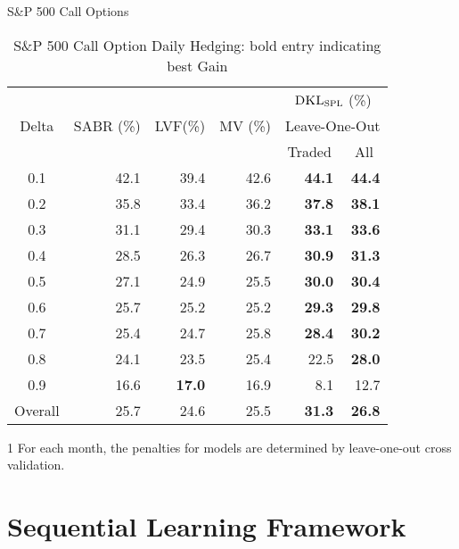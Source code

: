 \documentclass[10pt,table,mathserif]{beamer}
\newcommand{\DKLs}{\bf\textsc{DKL}_{\text{SPL}}}
\newcommand{\LVF}{\textsc{LVF}}
\begin{document}
\begin{frame}{S\&P 500 Call Options}
\begin{table}[htp!]
\centering
\begin{threeparttable}
\begin{tabular}{|c |r r r r r|}
\hline
\multirow{3}{*}{Delta}&\multirow{3}{*}{SABR (\%)}&\multirow{3}{*}{\LVF\;(\%)}&\multirow{3}{*}{MV (\%)}&\multicolumn{2}{c|}{$\DKLs$ (\%)}\\
&&&&\multicolumn{2}{c|}{\small Leave-One-Out\tnote{1} }\\
&&&&\multicolumn{1}{c}{\small Traded}&\multicolumn{1}{c|}{\small All}\\ \hline
  0.1 & 42.1 & 39.4 & 42.6 & \textbf{44.1} & \textbf{44.4}  \\
  0.2 & 35.8 & 33.4 & 36.2 & \textbf{37.8} & \textbf{38.1} \\
  0.3 & 31.1 & 29.4 & 30.3 & \textbf{33.1} & \textbf{33.6} \\
  0.4 & 28.5 & 26.3 & 26.7 & \textbf{30.9} & \textbf{31.3}   \\
  0.5 & 27.1 & 24.9 & 25.5 & \textbf{30.0}& \textbf{30.4}  \\
  0.6 & 25.7 & 25.2 & 25.2 & \textbf{29.3}& \textbf{29.8}  \\
  0.7 & 25.4 & 24.7 & 25.8 & \textbf{28.4} & \textbf{30.2}  \\
  0.8 & 24.1 & 23.5 & 25.4&   22.5& \textbf{28.0}  \\
  0.9 & 16.6 & \textbf{17.0} & 16.9 & 8.1  & 12.7  \\
  Overall & 25.7 & 24.6 & 25.5 & \textbf{31.3} & \textbf{26.8}  \\
  \hline
\end{tabular}
\caption{S\&P 500 Call Option Daily Hedging: bold entry indicating best Gain}
\label{SP500Call}
  \begin{tablenotes}
    \small
  \item[1] For each month, the penalties for models are determined by leave-one-out cross validation.
\end{tablenotes}

\end{threeparttable}

\end{table}
\end{frame}


\section{Sequential Learning Framework}
\end{document}
